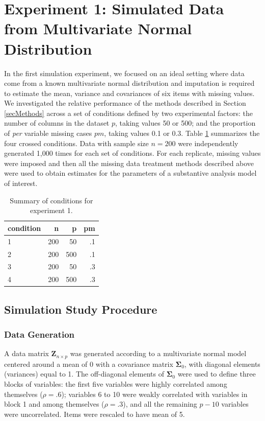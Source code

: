 \section{Experiment 1: Simulated Data from Multivariate Normal Distribution}

In the first simulation experiment, we focused on an ideal setting where data come from a known multivariate normal 
distribution and imputation is required to estimate the mean, variance and covariances of six items with missing values.
We investigated the relative performance of the methods described in Section \ref{secMethods} across a set of conditions 
defined by two experimental factors: the number of columns in the dataset $p$, taking values 50 or 500; 
and the proportion of \emph{per} variable missing cases $pm$, taking values 0.1 or 0.3.
Table \ref{tab:condExp1} summarizes the four crossed conditions.
Data with sample size $n=200$ were independently generated 1,000 times for each set of conditions.
For each replicate, missing values were imposed and then all the missing data treatment methods described above
were used to obtain estimates for the parameters of a substantive analysis model of interest.

\begin{table}
	\centering
	\begin{tabular}{l | r | r | r }
		condition & n & p & pm \\
		\hline
		1 & 200 & 50  & .1 \\
		2 & 200 & 500 & .1 \\
		3 & 200 & 50  & .3 \\
		4 & 200 & 500 & .3 \\
	\end{tabular}
	\caption{\label{tab:condExp1}Summary of conditions for experiment 1.}
\end{table}

\FloatBarrier %

\subsection{Simulation Study Procedure}

\subsubsection{Data Generation}
	A data matrix $\bm{Z}_{n \times p}$ was generated according to a multivariate normal model centered
	around a mean of 0 with a covariance matrix $\bm{\Sigma}_0$, with diagonal elements (variances) equal to 1.
	The off-diagonal elements of $\bm{\Sigma}_0$ were used to define three blocks of variables: 
	the first five variables were highly correlated among themselves ($\rho = .6$);
	variables 6 to 10 were weakly correlated with variables in block 1 and among themselves ($\rho = .3$), 
	and all the remaining $p-10$ variables were uncorrelated.
	Items were rescaled to have mean of 5.

